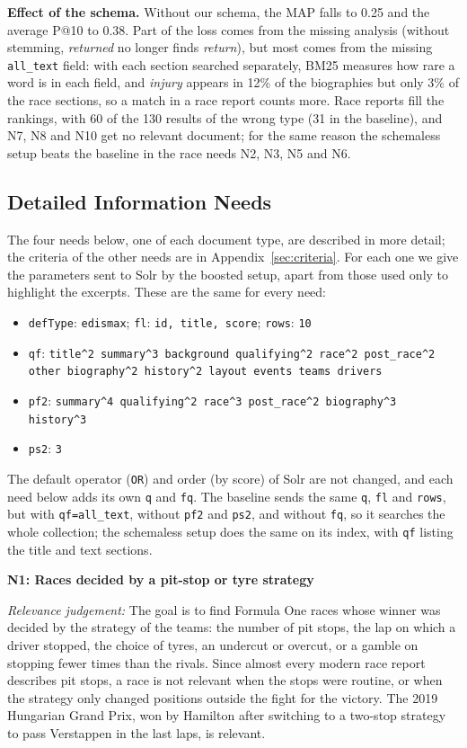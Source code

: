 \documentclass[sigconf]{acmart}
\newcommand{\needheading}[1]{\par\medskip\noindent\textbf{#1}\par\nopagebreak\smallskip}
\begin{document}
\textbf{Effect of the schema.} Without our schema, the MAP falls to 0.25 and
the average P@10 to 0.38. Part of the loss comes from the missing analysis
(without stemming, \textit{returned} no longer finds \textit{return}), but
most comes from the missing \texttt{all\_text} field: with each section
searched separately, BM25 measures how rare a word is in each field, and
\textit{injury} appears in 12\% of the biographies but only 3\% of the race
sections, so a match in a race report counts more. Race reports fill the
rankings, with 60 of the 130 results of the wrong type (31 in the baseline),
and N7, N8 and N10 get no relevant document; for the same reason the
schemaless setup beats the baseline in the race needs N2, N3, N5 and N6.

\subsection{Detailed Information Needs}
\label{sec:detailed}
The four needs below, one of each document type, are described in more
detail; the criteria of the other needs are in Appendix~\ref{sec:criteria}.
For each one we give the parameters sent to Solr by the boosted setup, apart
from those used only to highlight the excerpts. These are the same for every
need:
\begingroup\raggedright
\begin{itemize}
  \item \texttt{defType}: \texttt{edismax}; \texttt{fl}: \texttt{id, title,
  score}; \texttt{rows}: \texttt{10}
  \item \texttt{qf}: \texttt{title\^{}2 summary\^{}3 background
  qualifying\^{}2 race\^{}2 post\_race\^{}2 other biography\^{}2
  history\^{}2 layout events teams drivers}
  \item \texttt{pf2}: \texttt{summary\^{}4 qualifying\^{}2 race\^{}3
  post\_race\^{}2 biography\^{}3 history\^{}3}
  \item \texttt{ps2}: \texttt{3}
\end{itemize}
\endgroup
The default operator (\texttt{OR}) and order (by score) of Solr are not
changed, and each need below adds its own \texttt{q} and \texttt{fq}. The
baseline sends the same \texttt{q}, \texttt{fl} and \texttt{rows}, but with \texttt{qf=all\_text}, without \texttt{pf2} and
\texttt{ps2}, and without \texttt{fq}, so it searches the whole collection;
the schemaless setup does the same on its index, with \texttt{qf} listing the
title and text sections.

\needheading{N1: Races decided by a pit-stop or tyre strategy}
\textit{Relevance judgement:} The goal is to find Formula One races whose winner was decided by the
strategy of the teams: the number of pit stops, the lap on which a driver
stopped, the choice of tyres, an undercut or overcut, or a gamble on
stopping fewer times than the rivals. Since almost every modern race report
describes pit stops, a race is not relevant when the stops were routine, or
when the strategy only changed positions outside the fight for the victory.
The 2019 Hungarian Grand Prix, won by Hamilton after switching to a two-stop
strategy to pass Verstappen in the last laps, is relevant.
\end{document}
